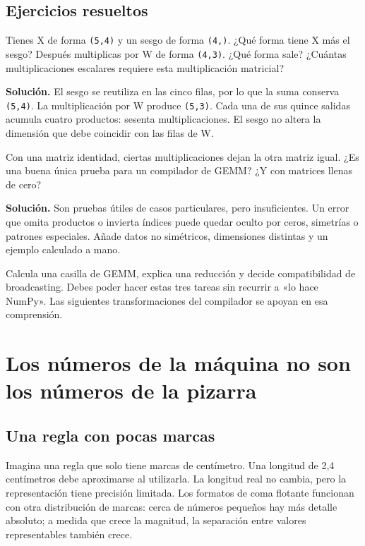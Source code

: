 \documentclass[12pt,a4paper,oneside]{report}
\begin{document}
\section{Ejercicios resueltos}
\begin{practica}
Tienes X de forma \texttt{(5,4)} y un sesgo de forma \texttt{(4,)}. ¿Qué forma tiene X más el sesgo? Después multiplicas por W de forma \texttt{(4,3)}. ¿Qué forma sale? ¿Cuántas multiplicaciones escalares requiere esta multiplicación matricial?

\end{practica}
\textbf{Solución.} El sesgo se reutiliza en las cinco filas, por lo que la suma conserva \texttt{(5,4)}. La multiplicación por W produce \texttt{(5,3)}. Cada una de sus quince salidas acumula cuatro productos: sesenta multiplicaciones. El sesgo no altera la dimensión que debe coincidir con las filas de W.

\begin{practica}
Con una matriz identidad, ciertas multiplicaciones dejan la otra matriz igual. ¿Es una buena única prueba para un compilador de GEMM? ¿Y con matrices llenas de cero?

\end{practica}
\textbf{Solución.} Son pruebas útiles de casos particulares, pero insuficientes. Un error que omita productos o invierta índices puede quedar oculto por ceros, simetrías o patrones especiales. Añade datos no simétricos, dimensiones distintas y un ejemplo calculado a mano.

\begin{comprueba}
Calcula una casilla de GEMM, explica una reducción y decide compatibilidad de broadcasting. Debes poder hacer estas tres tareas sin recurrir a «lo hace NumPy». Las siguientes transformaciones del compilador se apoyan en esa comprensión.

\end{comprueba}
\chapter{Los números de la máquina no son los números de la pizarra}
\label{ch:numeros}
\section{Una regla con pocas marcas}
Imagina una regla que solo tiene marcas de centímetro. Una longitud de 2,4 centímetros debe aproximarse al utilizarla. La longitud real no cambia, pero la representación tiene precisión limitada. Los formatos de coma flotante funcionan con otra distribución de marcas: cerca de números pequeños hay más detalle absoluto; a medida que crece la magnitud, la separación entre valores representables también crece.
\end{document}

